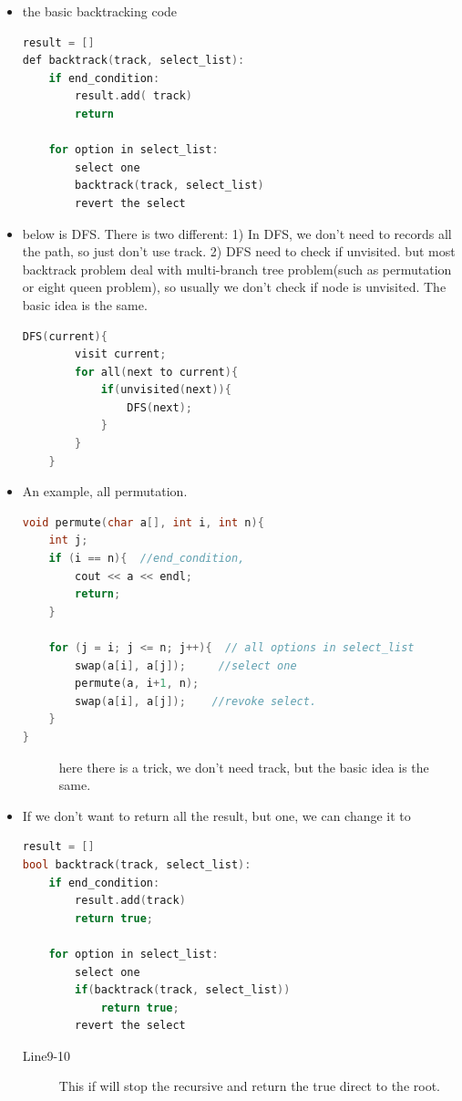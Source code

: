 \documentclass[a4paper,11pt,twoside]{book}
\begin{document}
\begin{itemize}
	\item the basic backtracking code
\begin{lstlisting}[frame=single, language=c++]
result = []
def backtrack(track, select_list):
	if end_condition:
		result.add( track)
		return

	for option in select_list:
		select one
		backtrack(track, select_list)
		revert the select	
\end{lstlisting}

\item below is DFS. There is two different: 1) In DFS, we don't need to records all the path, so just don't use track. 2) DFS need to check if unvisited. but most backtrack problem deal with multi-branch tree problem(such as permutation or eight queen problem), so usually we don't check if node is unvisited. The basic idea is the same. 
\begin{lstlisting}[frame=single, language=c++]
	DFS(current){
		visit current;
		for all(next to current){
			if(unvisited(next)){
				DFS(next);
			}
		}
	}
\end{lstlisting} 


	\item An example, all permutation. 
\begin{lstlisting}[frame=single, language=c++]
void permute(char a[], int i, int n){
	int j;
	if (i == n){  //end_condition, 
		cout << a << endl;
		return;
	}
	
	for (j = i; j <= n; j++){  // all options in select_list
		swap(a[i], a[j]);     //select one
		permute(a, i+1, n);
		swap(a[i], a[j]);    //revoke select.
	}
} 		
\end{lstlisting}
\begin{description}
	\item[] here there is a trick, we don't need track, but the basic idea is the same. 
\end{description}


\item If we don't want to return all the result, but one, we can change it to 
\begin{lstlisting}[frame=single, language=c++]
result = []
bool backtrack(track, select_list):
	if end_condition:
		result.add(track)
		return true;
	
	for option in select_list:
		select one
		if(backtrack(track, select_list))
			return true;
		revert the select	
\end{lstlisting}
\begin{description}
	\item[Line9-10] This if will stop the recursive and return the true direct to the root.
\end{description}

\end{itemize}
\end{document}
